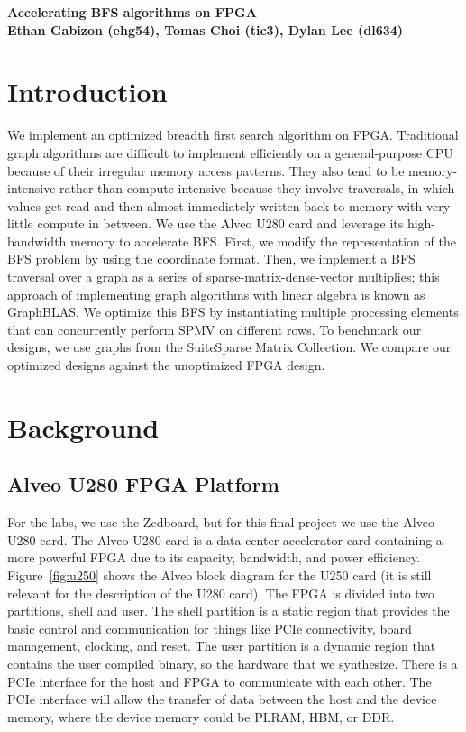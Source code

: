 \documentclass[10pt]{article}
\begin{document}
\begin{center}
    {\LARGE \textbf{Accelerating BFS algorithms on FPGA}} \\[10pt]
    \textbf{Ethan Gabizon (ehg54), Tomas Choi (tic3), Dylan Lee (dl634)}
\end{center}

\section{Introduction}
\noindent We implement an optimized breadth first search algorithm on FPGA. Traditional graph algorithms 
are difficult to implement efficiently on a general-purpose CPU because of their irregular memory 
access patterns. They also tend to be memory-intensive rather than compute-intensive because they 
involve traversals, in which values get read and then almost immediately written back to memory with 
very little compute in between. We use the Alveo U280 card and leverage its high-bandwidth memory to 
accelerate BFS. First, we modify the representation of the BFS problem by using the coordinate format.
Then, we implement a BFS traversal over a graph as a series of sparse-matrix-dense-vector multiplies; this 
approach of implementing graph algorithms with linear algebra is known as GraphBLAS. We optimize this BFS 
by instantiating multiple processing elements that can concurrently perform SPMV on different rows. To 
benchmark our designs, we use graphs from the SuiteSparse Matrix Collection. We compare our optimized designs
against the unoptimized FPGA design.

\section{Background}
\subsection{Alveo U280 FPGA Platform}
\noindent For the labs, we use the Zedboard, but for this final project we use the Alveo U280 card. The Alveo U280 
card is a data center accelerator card containing a more powerful FPGA due to its capacity, bandwidth, and 
power efficiency. Figure~\ref{fig:u250} shows the Alveo block diagram for the U250 card (it is still relevant for 
the description of the U280 card). The FPGA is divided into two partitions, shell and user. The shell partition 
is a static region that provides the basic control and communication for things like PCIe connectivity, board 
management, clocking, and reset. The user partition is a dynamic region that contains the user compiled binary,
so the hardware that we synthesize. There is a PCIe interface for the host and FPGA to communicate with each
other. The PCIe interface will allow the transfer of data between the host and the device memory, where the device 
memory could be PLRAM, HBM, or DDR. \newline
\end{document}
